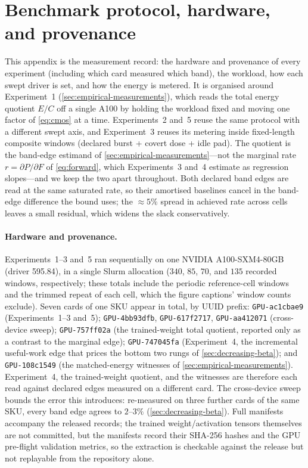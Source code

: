 \documentclass{article}
\theoremstyle{plain}
\theoremstyle{definition}
\theoremstyle{remark}
\begin{document}
\section{Benchmark protocol, hardware, and provenance}
\label{app:bench}

This appendix is the measurement record: the hardware and provenance of
every experiment (including which card measured which band), the workload, how each swept driver is set, and
how the energy is metered. It is organised around Experiment~1
(\cref{sec:empirical-measurements}), which reads the total energy
quotient $E/C$ off a single A100 by holding the workload fixed and moving
one factor of \cref{eq:cmos} at a time. Experiments~2 and~5 reuse the same
protocol with a different swept axis, and Experiment~3 reuses its metering
inside fixed-length composite windows (declared burst + covert dose +
idle pad). The quotient is the band-edge estimand of
\cref{sec:empirical-measurements}---not the marginal rate
$r = \partial P/\partial F$ of \cref{eq:forward}, which Experiments~3
and~4 estimate as regression slopes---and we keep the two apart
throughout. Both declared band edges are read at the same saturated rate,
so their amortised baselines cancel in the band-edge difference the bound
uses; the ${\approx}5\%$ spread in achieved rate across cells leaves a
small residual, which widens the slack conservatively.

\paragraph{Hardware and provenance.}
Experiments~1--3 and~5 ran sequentially on one NVIDIA A100-SXM4-80GB (driver
595.84), in a single Slurm allocation ($340$, $85$, $70$, and $135$ recorded windows, respectively; these totals include the periodic reference-cell windows and the trimmed repeat of each cell, which the figure captions' window counts exclude).
Seven cards of
one SKU appear in total, by UUID prefix: \texttt{GPU-ac1cbae9}
(Experiments~1--3 and~5); \texttt{GPU-4bb93dfb}, \texttt{GPU-617f2717},
\texttt{GPU-aa412071} (cross-device sweep); \texttt{GPU-757ff02a} (the
trained-weight total quotient, reported only as a contrast to the marginal
edge); \texttt{GPU-747045fa} (Experiment~4, the incremental useful-work
edge that prices the bottom two rungs of \cref{sec:decreasing-beta}); and
\texttt{GPU-108c1549} (the matched-energy witnesses of
\cref{sec:empirical-measurements}). Experiment~4, the trained-weight
quotient, and the witnesses are therefore each read against declared edges
measured on a different card. The cross-device sweep bounds the error this
introduces: re-measured on three further cards of the same SKU, every band
edge agrees to $2$--$3\%$ (\cref{sec:decreasing-beta}). Full manifests accompany the released
records; the trained weight/activation tensors themselves are not
committed, but the manifests record their SHA-256 hashes and the GPU
pre-flight validation metrics, so the extraction is checkable against the
release but not replayable from the repository alone.
\end{document}
